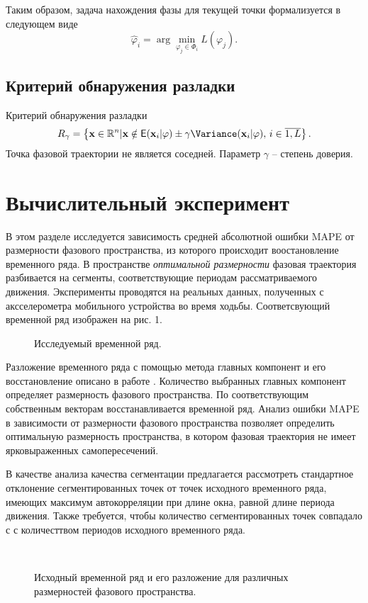 \documentclass[12pt, twoside]{article}
\theoremstyle{definition}
\def\RR{\mathbb R}
\begin{document}
 Таким образом, задача нахождения фазы для текущей точки формализуется в следующем виде
\[\widehat{\varphi}_i = \arg\min_{\varphi_j \in \Phi_i} L(\varphi_j).\]
\subsection{Критерий обнаружения разладки}
Критерий обнаружения разладки
    \[ R_{\gamma} = \left\{\mathbf{x}\in\RR^n|\mathbf{x} \notin \Expect(\mathbf{x}_i|\varphi)\pm\gamma\Variance(\mathbf{x}_i|\varphi), \, i\in \overline{1, L}\right\}.\]
Точка фазовой траектории не является соседней. Параметр $\gamma$ -- степень доверия.

\section{Вычислительный эксперимент}
В этом разделе исследуется зависимость средней абсолютной ошибки MAPE от размерности фазового пространства, из которого происходит воостановление временного ряда. В пространстве \emph{оптимальной размерности} фазовая траектория разбивается на сегменты, соответствующие периодам рассматриваемого движения. Эксперименты проводятся на реальных данных, полученных с аксселерометра мобильного устройства во время ходьбы. Соответсвующий временной ряд изображен на рис. 1.

    \begin{figure}[h!]\label{fig5}
	    \center{\texttt{[image: ts]}}
	    \caption{Исследуемый временной ряд.}
    \end{figure}
    
Разложение временного ряда с помощью метода главных компонент и его восстановление описано в работе \cite{motrenko2015extracting}. Количество выбранных главных компонент определяет размерность фазового пространства. По соответствующим собственным векторам восстанавливается временной ряд. Анализ ошибки MAPE в зависимости от размерности фазового пространства позволяет определить оптимальную размерность пространства, в котором фазовая траектория не имеет ярковыраженных самопересечений.

В качестве анализа качества сегментации предлагается рассмотреть стандартное отклонение сегментированных точек от точек исходного временного ряда, имеющих максимум автокорреляции при длине окна, равной длине периода движения. Также требуется, чтобы количество сегментированных точек совпадало с с количесттвом периодов исходного временного ряда.
    
    \begin{figure}[ht]\label{fig6}
        \\
        \caption{Исходный временной ряд и его разложение для различных размерностей фазового пространства.}
        \label{fg:mod}
    \end{figure}
\end{document}
